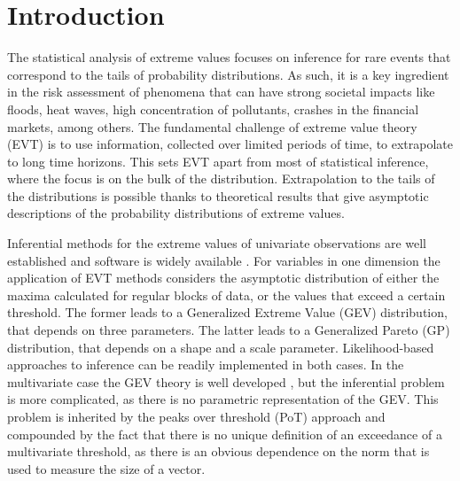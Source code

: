 
\section{Introduction}

The statistical analysis of extreme values focuses on inference for
    rare events that correspond to the tails of probability distributions.
    As such, it is a key ingredient in the risk assessment of
    phenomena that can have strong societal impacts like floods, heat waves,
    high concentration of pollutants, crashes in the financial markets,
    among others. The fundamental challenge of extreme value theory (EVT) is
    to use information, collected over limited periods of time, to
    extrapolate to long time horizons. This sets EVT apart from most of
    statistical inference, where the focus is on the bulk of the
    distribution. Extrapolation to the tails of the distributions is
    possible thanks to theoretical results that give asymptotic descriptions
    of the probability distributions of extreme values. 

Inferential methods for the extreme values of univariate observations
    are well established and software is widely available 
    \cite[see, for example,][]{coles2001}. For variables in one dimension the 
    application of EVT methods considers the asymptotic distribution of either the 
    maxima calculated for regular blocks of data, or the values that exceed a 
    certain threshold. The former leads to a Generalized Extreme Value (GEV) 
    distribution, that depends on three parameters. The latter leads to a Generalized 
    Pareto (GP) distribution, that depends on a shape and a scale parameter. 
    Likelihood-based approaches to inference can be readily implemented in both cases.
    In the multivariate case the GEV theory is well developed 
    \citep[see, for example][]{dehaan2006}, but the inferential problem is more 
    complicated, as there is no parametric representation of the GEV. This problem
    is inherited by the peaks over threshold (PoT) approach and compounded by the 
    fact that there is no unique definition of an exceedance of a multivariate 
    threshold, as there is an obvious dependence on the norm that is used to measure 
    the size of a vector. 

